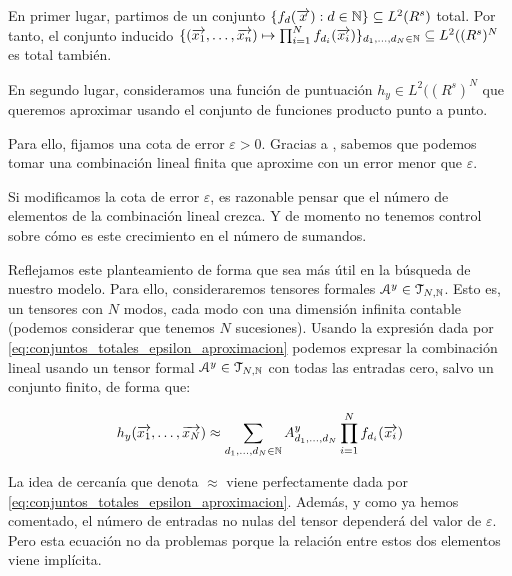 En primer lugar, partimos de un conjunto $\{f_d(\overrightarrow{x}): d \in \mathbb{N}\} \subseteq L^2(R^s)$ total. Por tanto, el conjunto inducido $\{(\overrightarrow{x_1}, \ldots, \overrightarrow{x_n}) \mapsto \prod_{i = 1}^N f_{d_i}(\overrightarrow{x_i}) \}_{d_1, \ldots, d_N \in \mathbb{N}} \subseteq L^2((R^s)^N$ es total también.

En segundo lugar, consideramos una función de puntuación $h_y \in L^2((R^s)^N$ que queremos aproximar usando el conjunto de funciones producto punto a punto.

Para ello, fijamos una cota de error $\varepsilon > 0$. Gracias a , sabemos que  podemos tomar una combinación lineal finita que aproxime con un error menor que $\varepsilon$.

\begin{observacion}
    Si modificamos la cota de error $\varepsilon$, es razonable pensar que el número de elementos de la combinación lineal crezca. Y de momento no tenemos control sobre cómo es este crecimiento en el número de sumandos.
\end{observacion}

Reflejamos este planteamiento de forma que sea más útil en la búsqueda de nuestro modelo. Para ello, consideraremos tensores formales $\mathcal{A}^y \in \mathcal{T}_{N, \mathbb{N}}$. Esto es, un tensores con $N$ modos, cada modo con una dimensión infinita contable (podemos considerar que tenemos $N$ sucesiones). Usando la expresión dada por \eqref{eq:conjuntos_totales_epsilon_aproximacion} podemos expresar la combinación lineal usando un tensor formal $\mathcal{A}^y \in \mathcal{T}_{N, \mathbb{N}}$ con todas las entradas cero, salvo un conjunto finito, de forma que:

\begin{equation} \label{eq:hipotesis_en_general}
    h_y(\overrightarrow{x_1}, \ldots, \overrightarrow{x_N}) \approx \sum_{d_1, \ldots, d_N \in \mathbb{N}} A^y_{d_1, \ldots, d_N} \prod_{i = 1}^N f_{d_i}(\overrightarrow{x_i})
\end{equation}

\begin{observacion}

    La idea de cercanía que denota $\approx$ viene perfectamente dada por \eqref{eq:conjuntos_totales_epsilon_aproximacion}. Además, y como ya hemos comentado, el número de entradas no nulas del tensor dependerá del valor de $\varepsilon$. Pero esta ecuación no da problemas porque la relación entre estos dos elementos viene implícita.

\end{observacion}

